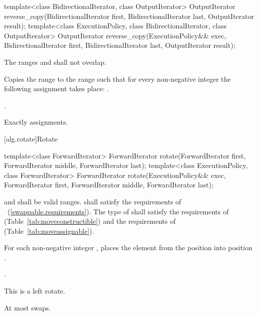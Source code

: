 %
\begin{itemdecl}
template<class BidirectionalIterator, class OutputIterator>
  OutputIterator
    reverse_copy(BidirectionalIterator first, BidirectionalIterator last,
                 OutputIterator result);
template<class ExecutionPolicy, class BidirectionalIterator, class OutputIterator>
  OutputIterator
    reverse_copy(ExecutionPolicy&& exec,
                 BidirectionalIterator first, BidirectionalIterator last,
                 OutputIterator result);
\end{itemdecl}

\begin{itemdescr}
\pnum
\requires
The ranges
and
shall not overlap.

\pnum
\effects
Copies the range
to the range
such that
for every non-negative integer
the following assignment takes place:
.

\pnum
\returns
{}.

\pnum
\complexity
Exactly
assignments.
\end{itemdescr}

[alg.rotate]{Rotate}

%
\begin{itemdecl}
template<class ForwardIterator>
  ForwardIterator
    rotate(ForwardIterator first, ForwardIterator middle, ForwardIterator last);
template<class ExecutionPolicy, class ForwardIterator>
  ForwardIterator
    rotate(ExecutionPolicy&& exec,
           ForwardIterator first, ForwardIterator middle, ForwardIterator last);
\end{itemdecl}

\begin{itemdescr}
\pnum
\requires
{}
and
shall be valid ranges.
 shall satisfy the requirements of
~(\ref{swappable.requirements}). The type of  shall satisfy
the requirements of 
(Table~\ref{tab:moveconstructible}) and the
requirements of
(Table~\ref{tab:moveassignable}).

\pnum
\effects
For each non-negative integer
,
places the element from the position
into position
.

\pnum
\returns {}.

\pnum
\remarks
This is a left rotate.

\pnum
\complexity
At most
swaps.
\end{itemdescr}

